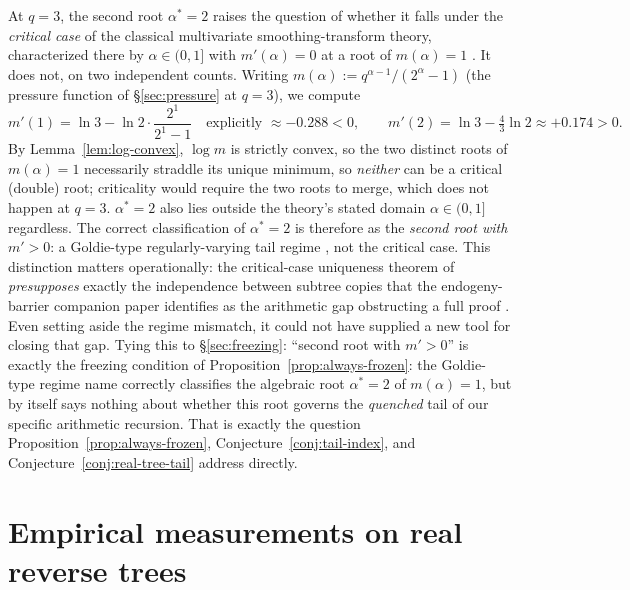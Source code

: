 \documentclass[11pt]{article}
\theoremstyle{remark}
\begin{document}
At $q=3$, the second root $\alpha^\ast=2$ raises the question of
whether it falls under the \emph{critical case} of the classical
multivariate smoothing-transform theory, characterized there by
$\alpha\in(0,1]$ with $m'(\alpha)=0$ at a root of $m(\alpha)=1$
\cite{KoleskoMentemeier2015}. It does not, on two independent counts.
Writing $m(\alpha):=q^{\alpha-1}/(2^\alpha-1)$ (the pressure function
of \S\ref{sec:pressure} at $q=3$), we compute
\[
  m'(1) = \ln 3 - \ln 2\cdot\frac{2^1}{2^1-1}
    \quad\text{explicitly } \approx -0.288 < 0, \qquad
  m'(2) = \ln 3 - \tfrac{4}{3}\ln 2 \approx +0.174 > 0.
\]
By Lemma~\ref{lem:log-convex}, $\log m$ is strictly convex, so the two
distinct roots of $m(\alpha)=1$ necessarily straddle its unique
minimum, so \emph{neither} can be a critical (double) root;
criticality would require the two roots to merge, which does not
happen at $q=3$. $\alpha^\ast=2$ also lies outside the theory's stated
domain $\alpha\in(0,1]$ regardless. The correct classification
of $\alpha^\ast=2$ is therefore as the \emph{second root with
$m'>0$}: a Goldie-type regularly-varying tail regime
\cite{Goldie1991,BuraczewskiDamekMikosch2016}, not the critical case.
This distinction matters operationally: the critical-case uniqueness
theorem of \cite{KoleskoMentemeier2015} \emph{presupposes} exactly the
independence between subtree copies that the endogeny-barrier companion
paper identifies as the arithmetic gap obstructing a full proof
\cite{BarrierCompanion}. Even setting aside the regime mismatch,
it could not have supplied a new tool for closing that gap. Tying this
to \S\ref{sec:freezing}: ``second root with $m'>0$'' is exactly the
freezing condition of Proposition~\ref{prop:always-frozen}: the
Goldie-type regime name correctly classifies the algebraic root
$\alpha^\ast=2$ of $m(\alpha)=1$, but by itself says nothing about
whether this root governs the \emph{quenched} tail of our specific
arithmetic recursion. That is exactly the question
Proposition~\ref{prop:always-frozen}, Conjecture~\ref{conj:tail-index},
and Conjecture~\ref{conj:real-tree-tail} address directly.

\section{Empirical measurements on real reverse trees}
\label{sec:empirical}
\end{document}
